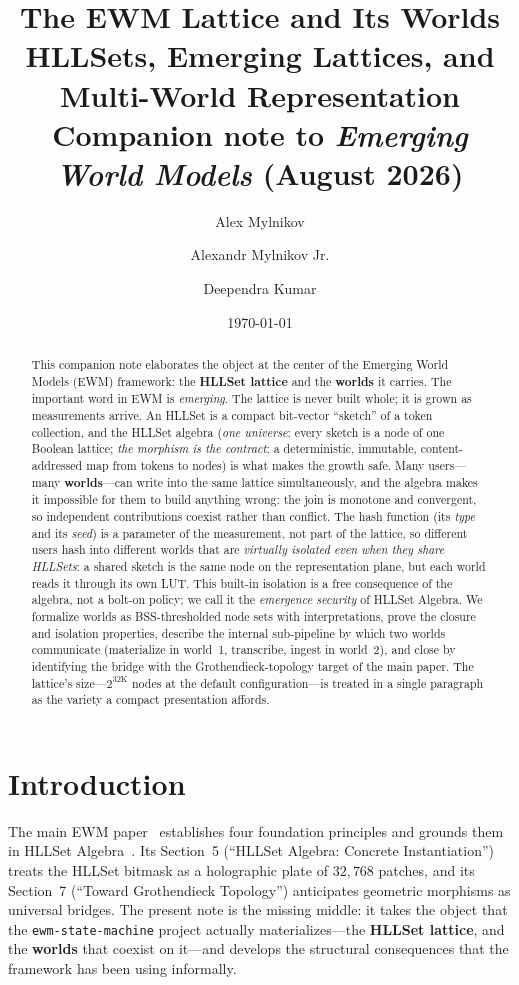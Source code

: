 \documentclass[11pt,a4paper]{article}
\title{\textbf{The EWM Lattice and Its Worlds}\\[4pt]
\large HLLSets, Emerging Lattices, and Multi-World Representation\\[6pt]
\normalsize Companion note to \textit{Emerging World Models} (August 2026)}
\author{Alex Mylnikov \and Alexandr Mylnikov Jr. \and Deependra Kumar}
\date{\today}
\theoremstyle{remark}
\begin{document}
\maketitle

\begin{abstract}
This companion note elaborates the object at the center of the Emerging World
Models (EWM) framework: the \textbf{HLLSet lattice} and the \textbf{worlds} it
carries. The important word in EWM is \emph{emerging}. The lattice is never
built whole; it is grown as measurements arrive. An HLLSet is a compact
bit-vector ``sketch'' of a token collection, and the HLLSet algebra
(\emph{one universe}: every sketch is a node of one Boolean lattice; \emph{the
morphism is the contract}: a deterministic, immutable, content-addressed map
from tokens to nodes) is what makes the growth safe. Many users---many
\textbf{worlds}---can write into the same lattice simultaneously, and the
algebra makes it impossible for them to build anything wrong: the join is
monotone and convergent, so independent contributions coexist rather than
conflict. The hash function (its \emph{type} and its \emph{seed}) is a
parameter of the measurement, not part of the lattice, so different users hash
into different worlds that are \emph{virtually isolated even when they share
HLLSets}: a shared sketch is the same node on the representation plane, but
each world reads it through its own LUT. This built-in isolation is a free
consequence of the algebra, not a bolt-on policy; we call it the
\emph{emergence security} of HLLSet Algebra. We formalize worlds as
BSS-thresholded node sets with interpretations, prove the closure and isolation
properties, describe the internal sub-pipeline by which two worlds communicate
(materialize in world~1, transcribe, ingest in world~2), and close by
identifying the bridge with the Grothendieck-topology target of the main paper.
The lattice's size---$2^{32\mathrm{K}}$ nodes at the default configuration---is
treated in a single paragraph as the variety a compact presentation affords.
\end{abstract}

\section{Introduction}

The main EWM paper~\cite{ewm2026} establishes four foundation principles and
grounds them in HLLSet Algebra~\cite{astesj2026}. Its Section~5 (``HLLSet
Algebra: Concrete Instantiation'') treats the HLLSet bitmask as a holographic
plate of $32{,}768$ patches, and its Section~7 (``Toward Grothendieck
Topology'') anticipates geometric morphisms as universal bridges. The present
note is the missing middle: it takes the object that the
\texttt{ewm-state-machine} project actually materializes---the \textbf{HLLSet
lattice}, and the \textbf{worlds} that coexist on it---and develops the
structural consequences that the framework has been using informally.
\end{document}

